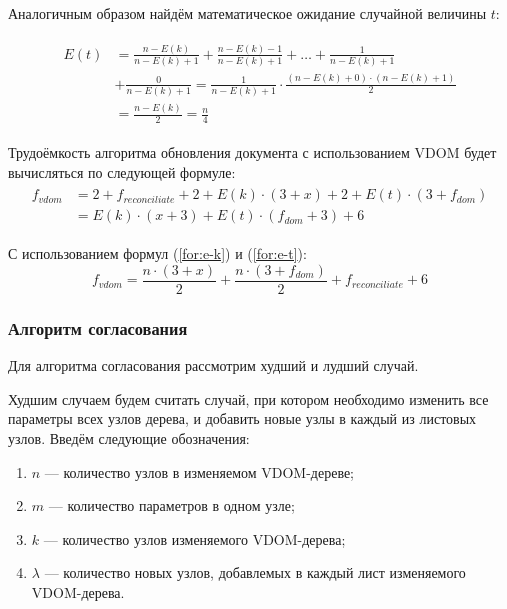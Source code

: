 Аналогичным образом найдём математическое ожидание случайной величины $t$:

\begin{align}
	\begin{split}
		\label{for:e-t}
		E(t) &= \frac{n - E(k)}{n - E(k) + 1} + \frac{n - E(k) - 1}{n - E(k) + 1} + \dotsc +  \frac{1}{n - E(k) + 1} \\
		&+\frac{0}{n - E(k) + 1} = \frac{1}{n - E(k) + 1} \cdot \frac{(n - E(k) + 0)\cdot(n - E(k) + 1)}{2}\\
		&= \frac{n - E(k)}{2} = \frac{n}{4}
	\end{split}
\end{align}

Трудоёмкость алгоритма обновления документа с использованием VDOM будет вычисляться по следующей формуле:
\begin{align}
	\begin{split}
	\label{for:f-vdom-1}
	f_{vdom} &= 2 + f_{reconciliate} + 2 + E(k)\cdot(3 + x) + 2 + E(t)\cdot(3 + f_{dom}) \\
	&= E(k) \cdot (x + 3) + E(t) \cdot (f_{dom} + 3) + 6
	\end{split}
\end{align}

С использованием формул (\ref{for:e-k}) и (\ref{for:e-t}):
\begin{equation}
	\label{for:f-vdom-2}
	f_{vdom} = \frac{n \cdot (3 + x)}{2} + \frac{n\cdot(3 + f_{dom})}{2} + f_{reconciliate} + 6
\end{equation}


\subsubsection{Алгоритм согласования}

Для алгоритма согласования рассмотрим худший и лудший случай.

Худшим случаем будем считать случай, при котором необходимо изменить все параметры всех узлов дерева, и добавить новые узлы в каждый из листовых узлов.
Введём следующие обозначения:
\begin{enumerate}[label=\arabic*)]
	\item $n$ --- количество узлов в изменяемом VDOM-дереве;
	\item $m$ --- количество параметров в одном узле;
	\item $k$ --- количество узлов изменяемого VDOM-дерева;
	\item $\lambda$ --- количество новых узлов, добавлемых в каждый лист изменяемого VDOM-дерева.
\end{enumerate}

